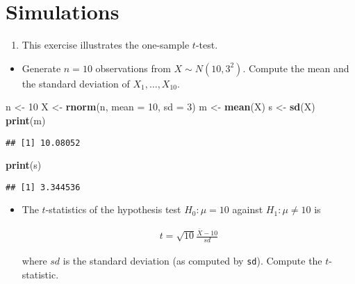\documentclass[]{article}
\newenvironment{Shaded}{\begin{snugshade}}{\end{snugshade}}
\newcommand{\KeywordTok}[1]{\textcolor[rgb]{0.13,0.29,0.53}{\textbf{#1}}}
\newcommand{\DataTypeTok}[1]{\textcolor[rgb]{0.13,0.29,0.53}{#1}}
\newcommand{\DecValTok}[1]{\textcolor[rgb]{0.00,0.00,0.81}{#1}}
\newcommand{\StringTok}[1]{\textcolor[rgb]{0.31,0.60,0.02}{#1}}
\newcommand{\NormalTok}[1]{#1}
\providecommand{\tightlist}{%
  \setlength{\itemsep}{0pt}\setlength{\parskip}{0pt}}
\begin{document}
\section{Simulations}\label{simulations}

\begin{enumerate}
\def\labelenumi{\arabic{enumi}.}
\tightlist
\item
  This exercise illustrates the one-sample \(t\)-test.
\end{enumerate}

\begin{itemize}
\tightlist
\item
  Generate \(n=10\) observations from \(X\sim N(10,3^{2})\). Compute the
  mean and the standard deviation of \(X_{1},\ldots ,X_{10}\).
\end{itemize}

\begin{Shaded}
\begin{Highlighting}[]
\NormalTok{n <-}\StringTok{ }\DecValTok{10}
\NormalTok{X <-}\StringTok{ }\KeywordTok{rnorm}\NormalTok{(n, }\DataTypeTok{mean =} \DecValTok{10}\NormalTok{, }\DataTypeTok{sd =} \DecValTok{3}\NormalTok{)}
\NormalTok{m <-}\StringTok{ }\KeywordTok{mean}\NormalTok{(X)}
\NormalTok{s <-}\StringTok{ }\KeywordTok{sd}\NormalTok{(X)}
\KeywordTok{print}\NormalTok{(m)}
\end{Highlighting}
\end{Shaded}

\begin{verbatim}
## [1] 10.08052
\end{verbatim}

\begin{Shaded}
\begin{Highlighting}[]
\KeywordTok{print}\NormalTok{(s)}
\end{Highlighting}
\end{Shaded}

\begin{verbatim}
## [1] 3.344536
\end{verbatim}

\begin{itemize}
\tightlist
\item
  The \(t\)-statistics of the hypothesis test \(H_{0}:\mu =10\) against
  \(H_{1}:\mu \neq 10\) is

  \begin{align*}
  t=\sqrt{10}\frac{\bar{X}-10}{sd}
  \end{align*}

  where \(sd\) is the standard deviation (as computed by \texttt{sd}).
  Compute the \(t\)-statistic.
\end{itemize}
\end{document}
